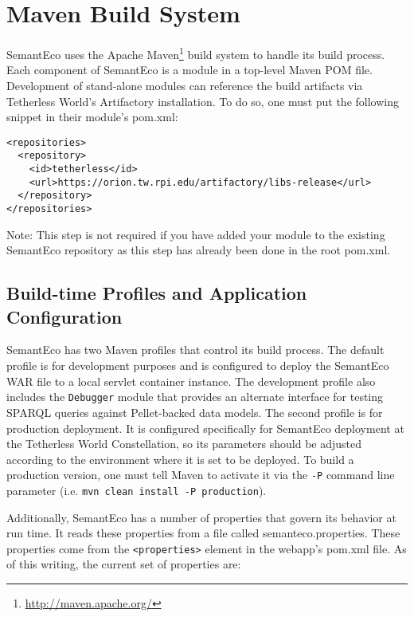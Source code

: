 \documentclass[letterpaper]{report}
\begin{document}
\appendix
\chapter{Maven Build System}
SemantEco uses the Apache Maven\footnote{\url{http://maven.apache.org/}} build system to handle its build process. Each component of SemantEco is a module in a top-level Maven POM file. Development of stand-alone modules can reference the build artifacts via Tetherless World's Artifactory installation. To do so, one must put the following snippet in their module's pom.xml:

\begin{lstlisting}
<repositories>
  <repository>
    <id>tetherless</id>
    <url>https://orion.tw.rpi.edu/artifactory/libs-release</url>
  </repository>
</repositories>
\end{lstlisting}

\noindent Note: This step is not required if you have added your module to the existing SemantEco repository as this step has already been done in the root pom.xml.

\section{Build-time Profiles and Application Configuration}
SemantEco has two Maven profiles that control its build process. The default profile is for development purposes and is configured to deploy the SemantEco WAR file to a local servlet container instance. The development profile also includes the \texttt{Debugger} module that provides an alternate interface for testing SPARQL queries against Pellet-backed data models. The second profile is for production deployment. It is configured specifically for SemantEco deployment at the Tetherless World Constellation, so its parameters should be adjusted according to the environment where it is set to be deployed. To build a production version, one must tell Maven to activate it via the \texttt{-P} command line parameter (i.e. \texttt{mvn clean install -P production}).

Additionally, SemantEco has a number of properties that govern its behavior at run time. It reads these properties from a file called semanteco.properties. These properties come from the \texttt{<properties>} element in the webapp's pom.xml file. As of this writing, the current set of properties are:
\end{document}
